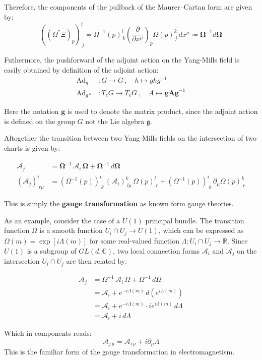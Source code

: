 Therefore, the components of the pullback of the Maurer–Cartan form are given by\cite{FredericSchullerLocalrepresentationsconnectionbasemanifoldYangMillsfieldsLec222015}:
\[
\left( (\Omega^* \Xi)_p \right)^i_{\,j} 
= \Omega^{-1}(p)^i_{\,k} \left( \frac{\partial}{\partial x^\mu} \right)_p \Omega(p)^k_{\,j} \, dx^\mu 
\coloneqq \mathbf{\Omega}^{-1} d\mathbf{\Omega}
\]



Futhermore, the pushforward of the adjoint action on the Yang-Mills field is easily obtained by definition of the adjoint action:
\begin{align*}
  \text{Ad}_g &: G \longrightarrow G \, , \quad h \mapsto ghg^{-1} \\
  \text{Ad}_{g*} &: T_eG \longrightarrow T_eG \, , \quad A \mapsto \mathbf{g A g}^{-1}
\end{align*}

Here the notation $\mathbf{g}$ is used to denote the matrix product, since the adjoint action is defined on the group $G$ not the Lie algebra $\mathfrak{g}$.

Altogether the transition between two Yang-Mills fields on the intersection of two charts is given by:

\begin{align*}
\mathbf{\mathcal{A}}_j 
&= \mathbf{\Omega}^{-1} \, \mathbf{\mathcal{A}}_i \, \mathbf{\Omega} 
  + \mathbf{\Omega}^{-1} \,  d \mathbf{\Omega} \\
(\mathcal{A}_j)^i_{\; r \mu} 
&= \left( \Omega^{-1}(p) \right)^i_{\; k} \, (\mathcal{A}_i)^k_{\; l \mu} \, \Omega(p)^l_{\; r}
+ \left( \Omega^{-1}(p) \right)^i_{\; k} \, \partial_\mu \Omega(p)^k_{\; r}
\end{align*}

This is simply the \textbf{gauge transformation} as known form gauge theories\cite{NakaharaGeometrytopologyphysics2005}.

As an example, consider the case of a $U(1)$ principal bundle. The transition function \( \Omega \) is a smooth function \( U_i \cap U_j \longrightarrow U(1) \), which can be expressed as \( \Omega(m) = \exp[i\Lambda(m)] \) for some real-valued function \( \Lambda: U_i \cap U_j \longrightarrow \mathbb{R} \). Since $U(1)$ is a subgroup of $GL(d,\mathbb{C})$, two local connection forms \( \mathcal{A}_i \) and \( \mathcal{A}_j \) on the intersection \( U_i \cap U_j \) are then related by:

\begin{align*}
  \mathcal{A}_j 
  &= \Omega^{-1} \, \mathcal{A}_i \, \Omega + \Omega^{-1} \, d\Omega \\
  &= \mathcal{A}_i + e^{-i\Lambda(m)} \, d\left( e^{i\Lambda(m)} \right) \\
  &= \mathcal{A}_i + e^{-i\Lambda(m)} \cdot i e^{i\Lambda(m)} \, d\Lambda \\
  &= \mathcal{A}_i + i \, d\Lambda
\end{align*}

Which in components reads:
\[ \mathcal{A}_{j \, \mu} = \mathcal{A}_{i \, \mu} + i\partial_\mu \Lambda \]
This is the familiar form of the gauge transformation in electromagnetism\cite{NakaharaGeometrytopologyphysics2005}.


